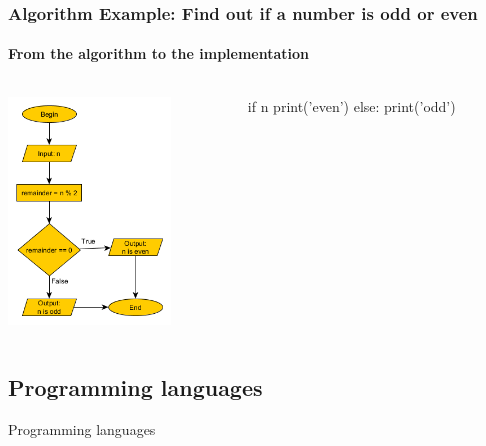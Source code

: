 \documentclass{beamer}
\begin{document}
\begin{frame}[fragile]
\frametitle{Algorithm Example: Find out if a number is odd or even}
\framesubtitle{From the algorithm to the implementation }

\begin{columns}

\begin{column}{0.5\textwidth}
\begin{center}
\includegraphics[width=43mm]{img/even-or-odd.png}
\end{center}
\end{column}

\begin{column}{0.4\textwidth}
\begin{python}
if n%
 	print('even')
else: 
 	print('odd')

\end{python}

\end{column}
\end{columns}
\end{frame}

\begin{frame}
\section{Programming languages}
\centering
\alert{Programming languages}
\end{frame}
\end{document}

